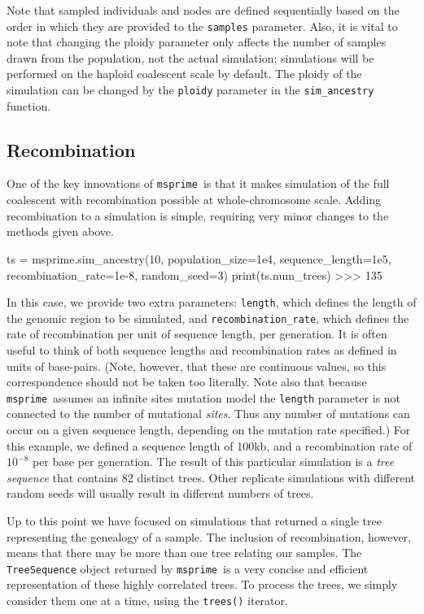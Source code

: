 \documentclass[graybox]{svmult}
\newcommand{\msprime}[0]{\texttt{msprime}}
\begin{document}
Note that sampled individuals and nodes are defined sequentially based
on the order in which they are provided to the \texttt{samples} parameter. Also, it is vital
to note that changing the ploidy parameter only affects the number of samples drawn from
the population, not the actual simulation; simulations will be performed on the
haploid coalescent scale by default. The ploidy of the simulation can be changed by the
\texttt{ploidy} parameter in the \texttt{sim\_ancestry} function.


\subsection{Recombination}\label{recombination}

One of the key innovations of \msprime\ is that it makes simulation of the
full coalescent with recombination possible at whole-chromosome scale.
Adding recombination to a simulation is simple, requiring very minor
changes to the methods given above.

\begin{pythoncode}
ts = msprime.sim_ancestry(10, population_size=1e4, sequence_length=1e5, recombination_rate=1e-8, random_seed=3)
print(ts.num_trees)
>>> 135
\end{pythoncode}

    In this case, we provide two extra parameters: \texttt{length}, which
defines the length of the genomic region to be simulated, and
\texttt{recombination\_rate}, which defines the rate of recombination
per unit of sequence length, per generation. It is often useful to
think of both sequence lengths and recombination rates as defined in units of base-pairs. (Note, however, that these are continuous values, so this
correspondence should not be taken too literally. Note also that because \msprime\ assumes an infinite sites mutation model
the \texttt{length} parameter is not connected to the number
of mutational \emph{sites}. Thus any number of mutations can occur on a
given sequence length, depending on the mutation rate specified.)
For this example, we
defined a sequence length of 100kb, and a recombination rate of
\(10^{-8}\) per base per generation. The result of this particular simulation is a
\emph{tree sequence} that contains 82 distinct trees. Other replicate
simulations with different random seeds will usually result in different
numbers of trees.

Up to this point we have focused on simulations that returned a single
tree representing the genealogy of a sample. The inclusion of
recombination, however, means that there may be more than one tree
relating our samples. The \texttt{TreeSequence} object returned by
\msprime\ is a very concise and efficient representation of these highly
correlated trees. To process the trees, we simply consider
them one at a time, using the \texttt{trees()} iterator.
\end{document}
